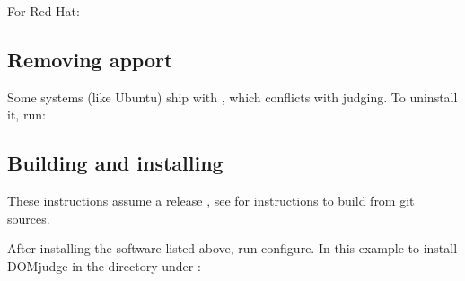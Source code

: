 \documentclass[a4paper,10pt,english,openany]{sphinxmanual}
\begin{document}
\sphinxAtStartPar
For Red Hat:

\begin{sphinxVerbatim}[commandchars=\\\{\}]
        \PYGZbs{}
          
\end{sphinxVerbatim}


\subsection{Removing apport}
\label{\detokenize{install-judgehost:removing-apport}}
\sphinxAtStartPar
Some systems (like Ubuntu) ship with , which conflicts with judging.
To uninstall it, run:

\begin{sphinxVerbatim}[commandchars=\\\{\}]
   
\end{sphinxVerbatim}


\subsection{Building and installing}
\label{\detokenize{install-judgehost:building-and-installing}}\label{\detokenize{install-judgehost:installing-judgehost}}
\sphinxAtStartPar
These instructions assume a release , see {\hyperref[\detokenize{develop:bootstrap}]{}}
for instructions to build from git sources.

\sphinxAtStartPar
After installing the software listed above, run configure. In this
example to install DOMjudge in the directory  under :

\begin{sphinxVerbatim}[commandchars=\\\{\}]
 
 
  
\end{sphinxVerbatim}
\end{document}
